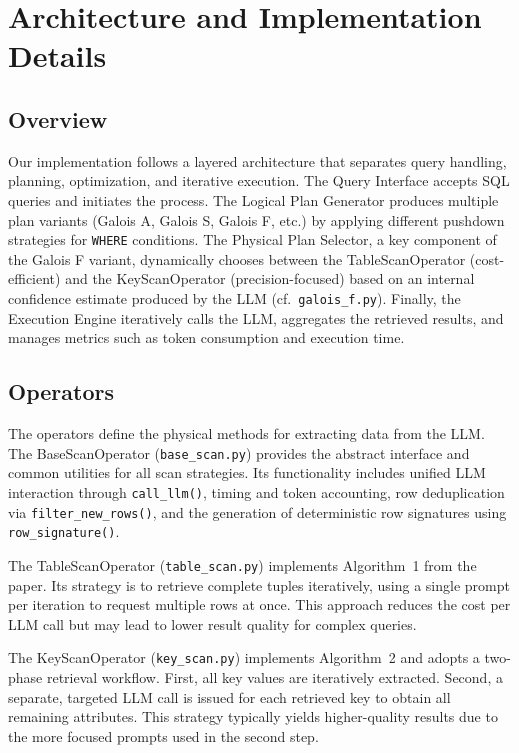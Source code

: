 \documentclass[12pt]{article}
\begin{document}
\section{Architecture and Implementation Details}

\subsection{Overview}
Our implementation follows a layered architecture that separates query handling, planning, optimization, and iterative execution. The Query Interface accepts SQL queries and initiates the process. The Logical Plan Generator produces multiple plan variants (Galois A, Galois S, Galois F, etc.) by applying different pushdown strategies for \texttt{WHERE} conditions. The Physical Plan Selector, a key component of the Galois F variant, dynamically chooses between the TableScanOperator (cost-efficient) and the KeyScanOperator (precision-focused) based on an internal confidence estimate produced by the LLM (cf.\ \texttt{galois\_f.py}). Finally, the Execution Engine iteratively calls the LLM, aggregates the retrieved results, and manages metrics such as token consumption and execution time.

\subsection{Operators}
The operators define the physical methods for extracting data from the LLM. The BaseScanOperator (\texttt{base\_scan.py}) provides the abstract interface and common utilities for all scan strategies. Its functionality includes unified LLM interaction through \texttt{call\_llm()}, timing and token accounting, row deduplication via \texttt{filter\_new\_rows()}, and the generation of deterministic row signatures using \texttt{row\_signature()}.

The TableScanOperator (\texttt{table\_scan.py}) implements Algorithm~1 from the paper. Its strategy is to retrieve complete tuples iteratively, using a single prompt per iteration to request multiple rows at once. This approach reduces the cost per LLM call but may lead to lower result quality for complex queries.

The KeyScanOperator (\texttt{key\_scan.py}) implements Algorithm~2 and adopts a two-phase retrieval workflow. First, all key values are iteratively extracted. Second, a separate, targeted LLM call is issued for each retrieved key to obtain all remaining attributes. This strategy typically yields higher-quality results due to the more focused prompts used in the second step.
\end{document}
